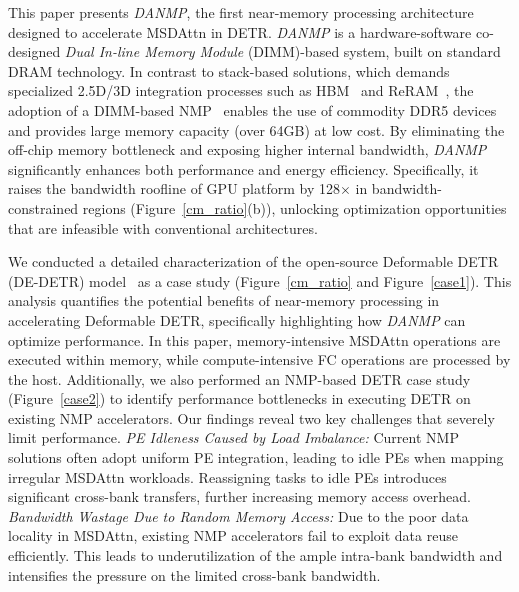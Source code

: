 \documentclass[sigconf]{acmart}
\begin{document}
This paper presents \textit{DANMP}, the first near-memory processing architecture designed to accelerate MSDAttn in DETR. \textit{DANMP} is a hardware-software co-designed \textit{Dual In-line Memory Module} (DIMM)-based system, built on standard DRAM technology. In contrast to stack-based solutions, which demands specialized 2.5D/3D integration processes such as HBM~\cite{Ahn2015isca, Zhou2022, Ding2023, micro2024li, highp2025} and ReRAM~\cite{ReGNN2022, asadi2024, resqm2020, cpsaa2024, resma2022, splim2025}, the adoption of a DIMM-based NMP~\cite{chen2023, sadimm2025, Kim2022, micro2024ham} enables the use of commodity DDR5 devices and provides large memory capacity (over 64GB) at low cost. By eliminating the off-chip memory bottleneck and exposing higher internal bandwidth, \textit{DANMP} significantly enhances both performance and energy efficiency. Specifically, it raises the {bandwidth roofline} of GPU platform by 128$\times$ in bandwidth-constrained regions (Figure~\ref{cm_ratio}(b)), unlocking optimization opportunities that are infeasible with conventional architectures.


We conducted a detailed characterization of the open-source Deformable DETR (DE-DETR) model~\cite{zhu2021deformable} as a case study (Figure~\ref{cm_ratio} and Figure~\ref{case1}). This analysis quantifies the potential benefits of near-memory processing in accelerating Deformable DETR, specifically highlighting how \textit{DANMP} can optimize performance. In this paper, memory-intensive MSDAttn operations are executed within memory, while compute-intensive FC operations are processed by the host. Additionally, we also performed an NMP-based DETR case study (Figure~\ref{case2}) to identify performance bottlenecks in executing DETR on existing NMP accelerators. Our findings reveal two key challenges that severely limit performance. \textit{PE Idleness Caused by Load Imbalance:} Current NMP solutions often adopt uniform PE integration, leading to idle PEs when mapping irregular MSDAttn workloads. Reassigning tasks to idle PEs introduces significant cross-bank transfers, further increasing memory access overhead. \textit{Bandwidth Wastage Due to Random Memory Access:} Due to the poor data locality in MSDAttn, existing NMP accelerators fail to exploit data reuse efficiently. This leads to underutilization of the ample intra-bank bandwidth and intensifies the pressure on the limited cross-bank bandwidth.
\end{document}

